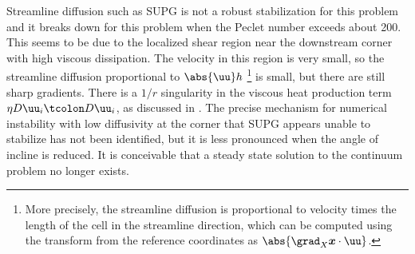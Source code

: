 Streamline diffusion such as SUPG is not a robust stabilization for this problem and it breaks down for this problem when the Peclet number exceeds about 200.
This seems to be due to the localized shear region near the downstream corner with high viscous dissipation.
The velocity in this region is very small, so the streamline diffusion proportional to $\abs{\uu} h$ \footnote{%
More precisely, the streamline diffusion is proportional to velocity times the length of the cell in the streamline direction, which can be computed using the transform from the reference coordinates as $\abs{\grad_X \bm x \cdot \uu}$.
} is small, but there are still sharp gradients.
There is a $1/r$ singularity in the viscous heat production term $\eta D\uu_i\tcolon D\uu_i$, as discussed in .
The precise mechanism for numerical instability with low diffusivity at the corner that SUPG appears unable to stabilize has not been identified, but it is less pronounced when the angle of incline is reduced.
It is conceivable that a steady state solution to the continuum problem no longer exists.
